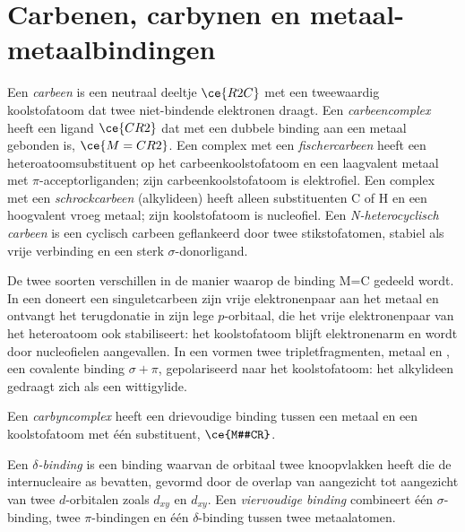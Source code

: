 \section{Carbenen, carbynen en metaal-metaalbindingen}

\begin{definition}\label{def:b3:organometallic-bonding:carbene}
Een \emph{carbeen} is een neutraal deeltje $\ce{R2C}$ met een tweewaardig koolstofatoom
dat twee niet-bindende elektronen draagt. Een
\emph{carbeencomplex}
heeft een ligand $\ce{CR2}$ dat met een dubbele binding aan een metaal gebonden is, $\ce{M=CR2}$. Een
complex met een \emph{fischercarbeen} heeft een
heteroatoomsubstituent op het carbeenkoolstofatoom en een laagvalent
metaal met $\pi$-acceptorliganden; zijn carbeenkoolstofatoom
is elektrofiel. Een complex met een
\emph{schrockcarbeen} (alkylideen)
heeft alleen substituenten C of H en een hoogvalent vroeg metaal; zijn
koolstofatoom is nucleofiel. Een
\emph{N-heterocyclisch carbeen} is een
cyclisch carbeen geflankeerd door twee stikstofatomen, stabiel als vrije
verbinding en een sterk
$\sigma$-donorligand.
\end{definition}

De twee soorten  verschillen in de manier waarop de
binding M=C gedeeld wordt.
In een  doneert een singuletcarbeen zijn vrije
elektronenpaar aan het metaal en ontvangt het terugdonatie in zijn lege $p$-orbitaal, die het vrije
elektronenpaar van het heteroatoom ook stabiliseert: het koolstofatoom
blijft elektronenarm en wordt door nucleofielen aangevallen. In een
 vormen twee tripletfragmenten, metaal en , een covalente binding $\sigma +
\pi$, gepolariseerd naar het koolstofatoom: het alkylideen gedraagt zich als een wittigylide.

\begin{definition}[Carbyncomplex]\label{def:b3:organometallic-bonding:carbyne}
Een \emph{carbyncomplex} heeft een drievoudige binding
tussen een metaal en een koolstofatoom met één substituent, $\ce{M#CR}$.
\end{definition}

\begin{definition}\label{def:b3:organometallic-bonding:delta}
Een \emph{$\delta$-binding} is een binding waarvan de orbitaal twee knoopvlakken heeft
die de internucleaire as bevatten, gevormd door de overlap van aangezicht
tot aangezicht van twee $d$-orbitalen zoals $d_{xy}$ en $d_{xy}$. Een
\emph{viervoudige binding}
combineert één $\sigma$-binding, twee $\pi$-bindingen en één $\delta$-binding tussen twee metaalatomen.
\end{definition}

